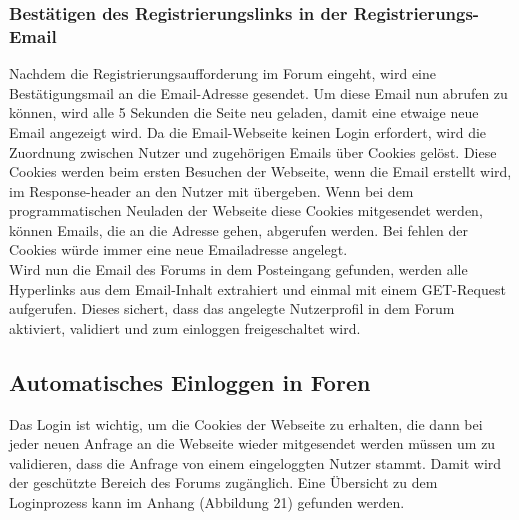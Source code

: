 \subsubsection{Bestätigen des Registrierungslinks in der Registrierungs-Email}
Nachdem die Registrierungsaufforderung im Forum eingeht, wird eine Bestätigungsmail an die Email-Adresse gesendet.
Um diese Email nun abrufen zu können, wird alle 5 Sekunden die Seite neu geladen, damit eine etwaige neue Email angezeigt wird. Da die Email-Webseite keinen Login erfordert, wird die Zuordnung zwischen Nutzer und zugehörigen Emails über Cookies gelöst. Diese Cookies werden beim ersten Besuchen der Webseite, wenn die Email erstellt wird, im Response-header an den Nutzer mit übergeben. Wenn bei dem programmatischen Neuladen der Webseite diese Cookies mitgesendet werden, können Emails, die an die Adresse gehen, abgerufen werden. Bei fehlen der Cookies würde immer eine neue Emailadresse angelegt.\\
Wird nun die Email des Forums in dem Posteingang gefunden, werden alle Hyperlinks aus dem Email-Inhalt extrahiert und einmal mit einem GET-Request aufgerufen. Dieses sichert, dass das angelegte Nutzerprofil in dem Forum aktiviert, validiert und zum einloggen freigeschaltet wird.


\subsection {Automatisches Einloggen in Foren}
Das Login ist wichtig, um die Cookies der Webseite zu erhalten, die dann bei jeder neuen Anfrage an die Webseite wieder mitgesendet werden müssen um zu validieren, dass die Anfrage von einem eingeloggten Nutzer stammt. Damit wird der geschützte Bereich des Forums zugänglich.
Eine Übersicht zu dem Loginprozess kann im Anhang (Abbildung 21) gefunden werden.

